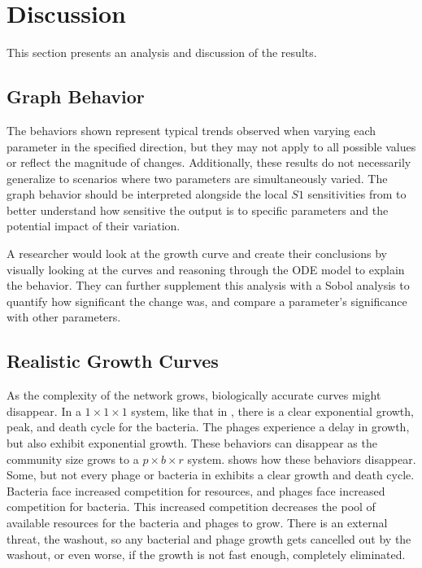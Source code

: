 \chapter{Discussion}
\label{Discussion}
This section presents an analysis and discussion of the results. 

\section{Graph Behavior}
The behaviors shown represent typical trends observed when varying each parameter in the specified direction, but they may not apply to all possible values or reflect the magnitude of changes. 
Additionally, these results do not necessarily generalize to scenarios where two parameters are simultaneously varied. 
The graph behavior should be interpreted alongside the local $S1$ sensitivities from  to better understand how sensitive the output is to specific parameters and the potential impact of their variation.

A researcher would look at the growth curve and create their conclusions by visually looking at the curves and reasoning through the ODE model to explain the behavior. 
They can further supplement this analysis with a Sobol analysis to quantify how significant the change was, and compare a parameter's significance with other parameters. 

\section{Realistic Growth Curves}
As the complexity of the network grows, biologically accurate curves might disappear. 
In a $1\times 1\times 1$ system, like that in , there is a clear exponential growth, peak, and death cycle for the bacteria. 
The phages experience a delay in growth, but also exhibit exponential growth. 
These behaviors can disappear as the community size grows to a $p\times b\times r$ system. 
 shows how these behaviors disappear. 
Some, but not every phage or bacteria in  exhibits a clear growth and death cycle. 
Bacteria face increased competition for resources, and phages face increased competition for bacteria. 
This increased competition decreases the pool of available resources for the bacteria and phages to grow. 
There is an external threat, the washout, so any bacterial and phage growth gets cancelled out by the washout, or even worse, if the growth is not fast enough, completely eliminated. 

